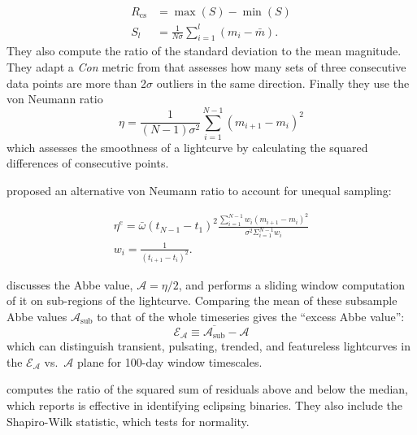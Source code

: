 \documentclass[DM,authoryear,toc]{lsstdoc}
\begin{document}
\begin{equation}
\begin{aligned} R_{\mathrm{cs}} &=\max (S)-\min (S) \\ S_{l} &=\frac{1}{N \sigma} \sum_{i=1}^{l}\left(m_{i}-\bar{m}\right). \end{aligned}
\end{equation}
They also compute the ratio of the standard deviation to the mean magnitude. 
They adapt a \textit{Con} metric from \citet{Wozniak:00:Difference-Imag} that assesses how many sets of three consecutive data points are more than 2$\sigma$ outliers in the same direction.
Finally they use the von Neumann ratio 
\begin{equation}
\eta=\frac{1}{(N-1) \sigma^{2}} \sum_{i=1}^{N-1}\left(m_{i+1}-m_{i}\right)^{2}
\end{equation}
which assesses the smoothness of a lightcurve by calculating the squared differences of consecutive points.

\citet{Kim:14:The-EPOCH-Proje} proposed an alternative von Neumann ratio to account for unequal sampling:

\begin{equation}
\begin{array}{l}{\eta^{e}=\bar{\omega}\left(t_{N-1}-t_{1}\right)^{2} \frac{\sum_{i=1}^{N-1} w_{i}\left(m_{i+1}-m_{i}\right)^{2}}{\sigma^{2} \Sigma_{i=1}^{N-1} w_{i}}} \\ {w_{i}=\frac{1}{\left(t_{i+1}-t_{i}\right)^{2}}}.\end{array}
\end{equation}

\citet{Mowlavi:14:AbbeValue} discusses the Abbe value, $\mathcal{A} = \eta/2$, and performs a sliding window computation of it on sub-regions of the lightcurve.
Comparing the mean of these subsample Abbe values $\mathcal{A}_{\mathrm{sub}}$ to that of the whole timeseries gives the ``excess Abbe value'':
\begin{equation}
\mathcal{E}_{\mathcal{A}} \equiv \overline{\mathcal{A}_{\mathrm{sub}}}-\mathcal{A}
\end{equation}
which can distinguish transient, pulsating, trended, and featureless lightcurves in the $\mathcal{E}_{\mathcal{A}}$ vs.\ $\mathcal{A}$ plane for 100-day window timescales.


\citet{Kim:16:UPSILoN} computes the ratio of the squared sum of residuals above and below the median, which \citet{Jayasinghe:19:ASASSNVarsIII} reports is effective in identifying eclipsing binaries.
They also include the Shapiro-Wilk statistic, which tests for normality.
\end{document}
